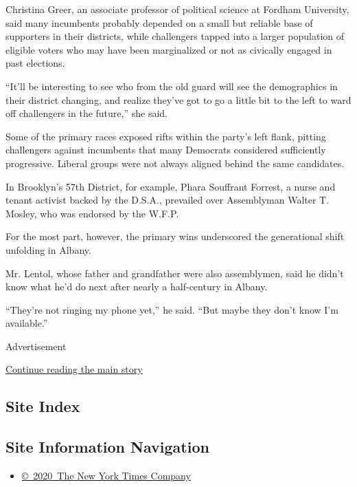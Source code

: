 Christina Greer, an associate professor of political science at Fordham
University, said many incumbents probably depended on a small but
reliable base of supporters in their districts, while challengers tapped
into a larger population of eligible voters who may have been
marginalized or not as civically engaged in past elections.

``It'll be interesting to see who from the old guard will see the
demographics in their district changing, and realize they've got to go a
little bit to the left to ward off challengers in the future,'' she
said.

Some of the primary races exposed rifts within the party's left flank,
pitting challengers against incumbents that many Democrats considered
sufficiently progressive. Liberal groups were not always aligned behind
the same candidates.

In Brooklyn's 57th District, for example, Phara Souffrant Forrest, a
nurse and tenant activist backed by the D.S.A., prevailed over
Assemblyman Walter T. Mosley, who was endorsed by the W.F.P.

For the most part, however, the primary wins underscored the
generational shift unfolding in Albany.

Mr. Lentol, whose father and grandfather were also assemblymen, said he
didn't know what he'd do next after nearly a half-century in Albany.

``They're not ringing my phone yet,'' he said. ``But maybe they don't
know I'm available.''

Advertisement

\protect\hyperlink{after-bottom}{Continue reading the main story}

\hypertarget{site-index}{%
\subsection{Site Index}\label{site-index}}

\hypertarget{site-information-navigation}{%
\subsection{Site Information
Navigation}\label{site-information-navigation}}

\begin{itemize}
\tightlist
\item
  \href{https://help.nytimes3xbfgragh.onion/hc/en-us/articles/115014792127-Copyright-notice}{©~2020~The
  New York Times Company}
\end{itemize}

